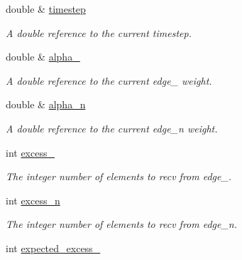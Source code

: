 \begin{DoxyCompactItemize}
\item 
\hypertarget{classone__d_1_1solver_a490325a537d8addf5edea22b7ae4c4f5}{double \& \hyperlink{classone__d_1_1solver_a490325a537d8addf5edea22b7ae4c4f5}{timestep}}\label{classone__d_1_1solver_a490325a537d8addf5edea22b7ae4c4f5}

\begin{DoxyCompactList}\small\item\em A double reference to the current timestep. \end{DoxyCompactList}\item 
\hypertarget{classone__d_1_1solver_aa38c2e7d7f91ab64f3de449ad4f0c5c8}{double \& \hyperlink{classone__d_1_1solver_aa38c2e7d7f91ab64f3de449ad4f0c5c8}{alpha\-\_}}\label{classone__d_1_1solver_aa38c2e7d7f91ab64f3de449ad4f0c5c8}

\begin{DoxyCompactList}\small\item\em A double reference to the current edge\-\_ weight. \end{DoxyCompactList}\item 
\hypertarget{classone__d_1_1solver_a3e383f0bfc5e541f22583110eae4c9ab}{double \& \hyperlink{classone__d_1_1solver_a3e383f0bfc5e541f22583110eae4c9ab}{alpha\-\_\-n}}\label{classone__d_1_1solver_a3e383f0bfc5e541f22583110eae4c9ab}

\begin{DoxyCompactList}\small\item\em A double reference to the current edge\-\_\-n weight. \end{DoxyCompactList}\item 
\hypertarget{classone__d_1_1solver_a07b2fb5dd4cffd6acc7c4e641173c444}{int \hyperlink{classone__d_1_1solver_a07b2fb5dd4cffd6acc7c4e641173c444}{excess\-\_}}\label{classone__d_1_1solver_a07b2fb5dd4cffd6acc7c4e641173c444}

\begin{DoxyCompactList}\small\item\em The integer number of elements to recv from edge\-\_. \end{DoxyCompactList}\item 
\hypertarget{classone__d_1_1solver_a3d3f3a518faff396383fcbad9bed4da2}{int \hyperlink{classone__d_1_1solver_a3d3f3a518faff396383fcbad9bed4da2}{excess\-\_\-n}}\label{classone__d_1_1solver_a3d3f3a518faff396383fcbad9bed4da2}

\begin{DoxyCompactList}\small\item\em The integer number of elements to recv from edge\-\_\-n. \end{DoxyCompactList}\item 
\hypertarget{classone__d_1_1solver_ad9d68340476561f45d2c16226e65099d}{int \hyperlink{classone__d_1_1solver_ad9d68340476561f45d2c16226e65099d}{expected\-\_\-excess\-\_}}\label{classone__d_1_1solver_ad9d68340476561f45d2c16226e65099d}


\end{DoxyCompactItemize}
